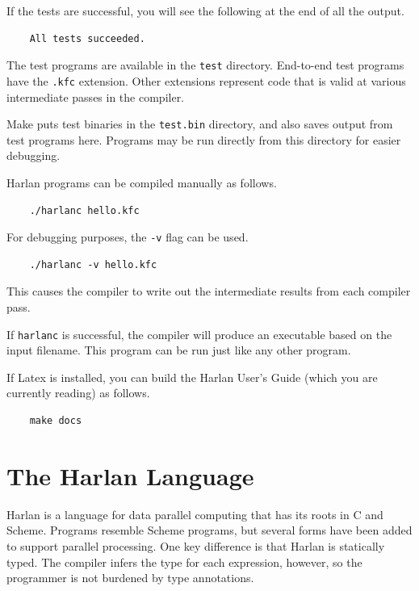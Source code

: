 \documentclass[oneside]{report}
\begin{document}
If the tests are successful, you will see the following at the end of
all the output.

\begin{verbatim}
    All tests succeeded.
\end{verbatim}

The test programs are available in the \texttt{test}
directory. End-to-end test programs have the \texttt{.kfc}
extension. Other extensions represent code that is valid at various
intermediate passes in the compiler.

Make puts test binaries in the \texttt{test.bin} directory, and also
saves output from test programs here. Programs may be run directly
from this directory for easier debugging.

Harlan programs can be compiled manually as follows.

\begin{verbatim}
    ./harlanc hello.kfc
\end{verbatim}

For debugging purposes, the \texttt{-v} flag can be used.

\begin{verbatim}
    ./harlanc -v hello.kfc
\end{verbatim}

This causes the compiler to write out the intermediate results from
each compiler pass.

If \texttt{harlanc} is successful, the compiler will produce an
executable based on the input filename. This program can be run just
like any other program.

If Latex is installed, you can build the Harlan User's Guide (which
you are currently reading) as follows.

\begin{verbatim}
    make docs
\end{verbatim}



\chapter{The Harlan Language}

Harlan is a language for data parallel computing that has its roots in
C and Scheme. Programs resemble Scheme programs, but several forms
have been added to support parallel processing. One key difference is
that Harlan is statically typed. The compiler infers the type for each
expression, however, so the programmer is not burdened by type
annotations.
\end{document}
